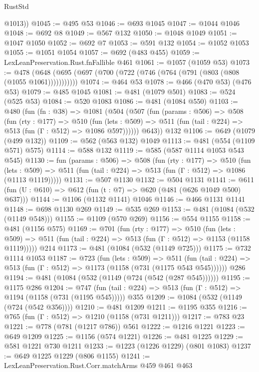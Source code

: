\begin{lexlean}{RustStd}
\begin{coremodule}
        @1013))
@1045 := @495 @53
@1046 := @693 @1045
@1047 := @1044 @1046
@1048 := @692 @8
@1049 := @567 @132
@1050 := @1048 @1049
@1051 := @1047 @1050
@1052 := @692 @7
@1053 := @591 @132
@1054 := @1052 @1053
@1055 := @1051 @1054
@1057 := @692 (@483 @455)
@1059 := LexLeanPreservation.Rust.fnFallible @461
@1061 := @1057 (@1059 @53)
@1073 := @478 (@648 (@695 (@697 (@700 (@722 (@746 (@764 (@791 (@803 (@808 (@1055 @1061)))))))))))
@1074 := @464 @53
@1078 := @466 (@470 @53) (@476 @53)
@1079 := @485 @1045
@1081 := @481 (@1079 @501)
@1083 := @524 (@525 @53)
@1084 := @520 @1083
@1086 := @481 (@1084 @550)
@1103 := @480
    (fun (fn : @38) =>
    @1081
      (@504
        (@507
          (fun (params : @506) =>
          @508
            (fun (rty : @177) =>
            @510
              (fun (lets : @509) =>
              @511 (fun (tail : @224) => @513 (fun (Γ : @512) => @1086 @597))))))
        @643))
    @132
@1106 := @649 (@1079 (@499 @132))
@1109 := @562 (@563 @132) @1049
@1113 := @481 (@554 (@1109 @571) @575)
@1114 := @588 @132
@1119 := @585 (@587 @1114 @1053 @543 @545)
@1130 := fun (params : @506) =>
  @508
    (fun (rty : @177) =>
    @510
      (fun (lets : @509) =>
      @511 (fun (tail : @224) => @513 (fun (Γ : @512) => @1086 (@1113 @1119)))))
@1131 := @507 @1130
@1132 := @504 @1131
@1141 := @611 (fun (U : @610) => @612 (fun (t : @7) => @620 (@481 (@626 @1049 @500) @637)))
@1144 := @1106 (@1132 @1141) @1046
@1146 := @466 @1131 @1141
@1148 := @698 @1130 @269
@1149 := @535 @269
@1153 := @481 (@1084 (@532 (@1149 @548)))
@1155 := @1109 (@570 @269)
@1156 := @554 @1155
@1158 := @481 (@1156 @575)
@1169 := @701
    (fun (rty : @177) =>
    @510
      (fun (lets : @509) =>
      @511 (fun (tail : @224) => @513 (fun (Γ : @512) => @1153 (@1158 @1119)))))
    @214
@1173 := @481 (@1084 (@532 (@1149 @725)))
@1175 := @732 @1114 @1053
@1187 := @723
    (fun (lets : @509) =>
    @511 (fun (tail : @224) => @513 (fun (Γ : @512) => @1173 (@1158 (@731 (@1175 @543 @545))))))
    @286
@1194 := @481 (@1084 (@532 (@1149 (@724 (@542 (@287 @545))))))
@1195 := @1175 @286
@1204 := @747 (fun (tail : @224) => @513 (fun (Γ : @512) => @1194 (@1158 (@731 (@1195 @545))))) @355
@1209 := @1084 (@532 (@1149 (@724 (@542 @356))))
@1210 := @481 @1209
@1211 := @1195 @355
@1216 := @765 (fun (Γ : @512) => @1210 (@1158 (@731 @1211)))
@1217 := @783 @23
@1221 := @778 (@781 (@1217 @786)) @561
@1222 := @1216 @1221
@1223 := @649 @1209
@1225 := @1156 (@574 @1221)
@1226 := @481 @1225
@1229 := @581 @1221 @730 @1211
@1233 := @1223 (@1226 @1229) (@801 @1083)
@1237 := @649 @1225 @1229 (@806 @1155)
@1241 := LexLeanPreservation.Rust.Corr.matchArms @459 @461 @463

\end{coremodule}
\end{lexlean}
